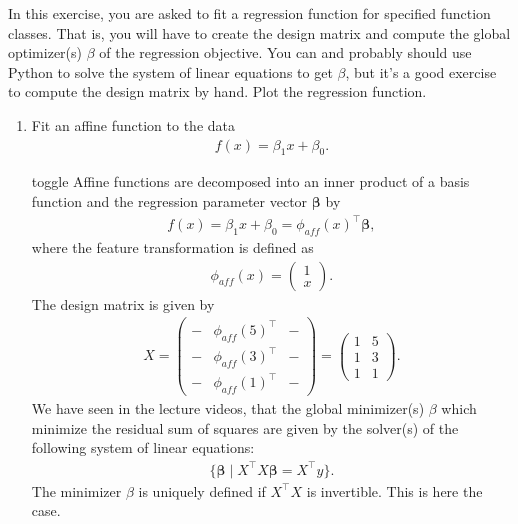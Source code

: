 \documentclass[letterpaper,10pt,english]{jupyterBook}
\begin{document}
\begin{enumerate}
\sphinxAtStartPar
In this exercise, you are asked to fit a regression function for specified function classes.
That is, you will have to create the design matrix and compute the global optimizer(s) \(\beta\) of the regression objective. You can and probably should use Python to solve the system of linear equations to get \(\beta\), but it’s a good exercise  to compute the design matrix by hand. Plot the regression function.
\begin{enumerate}
%
\item {} 
\sphinxAtStartPar
Fit an affine function to the data
\begin{align*} f(x) = \beta_1 x + \beta_0.\end{align*}
\begin{sphinxuseclass}{toggle}
\sphinxAtStartPar
Affine functions are decomposed into an inner product of a basis function and the regression parameter vector \(\bm\beta\) by
\begin{align*}
f(x)=\beta_1 x + \beta_0 =\phi_{aff}(x)^\top \bm\beta,
\end{align*}
\sphinxAtStartPar
where the feature transformation is defined as
\begin{equation*}
\begin{split}\phi_{aff}(x)=\begin{pmatrix}1\\x\end{pmatrix}.\end{split}
\end{equation*}
\sphinxAtStartPar
The design matrix is given by
\begin{align*} X = \begin{pmatrix} - & \phi_{aff}(5)^\top & -\\- & \phi_{aff}(3)^\top & -\\
- & \phi_{aff}(1)^\top & -
\end{pmatrix}
=
\begin{pmatrix}
1 & 5\\
1 & 3\\
1 & 1
\end{pmatrix}.
\end{align*}
\sphinxAtStartPar
We have seen in the lecture videos, that the global minimizer(s) \(\beta\) which minimize the residual sum of squares are given by the solver(s) of the following system of linear equations:
\begin{equation}\label{equation:regression_exercises:eq_sysbeta}
\begin{split}\{\bm\beta\mid X^\top X\bm\beta = X^\top y\}.\end{split}
\end{equation}
\sphinxAtStartPar
The minimizer \(\beta\) is uniquely defined if \(X^\top X\) is invertible. This is here the case.


\end{sphinxuseclass}
\end{enumerate}
\end{enumerate}
\end{document}
